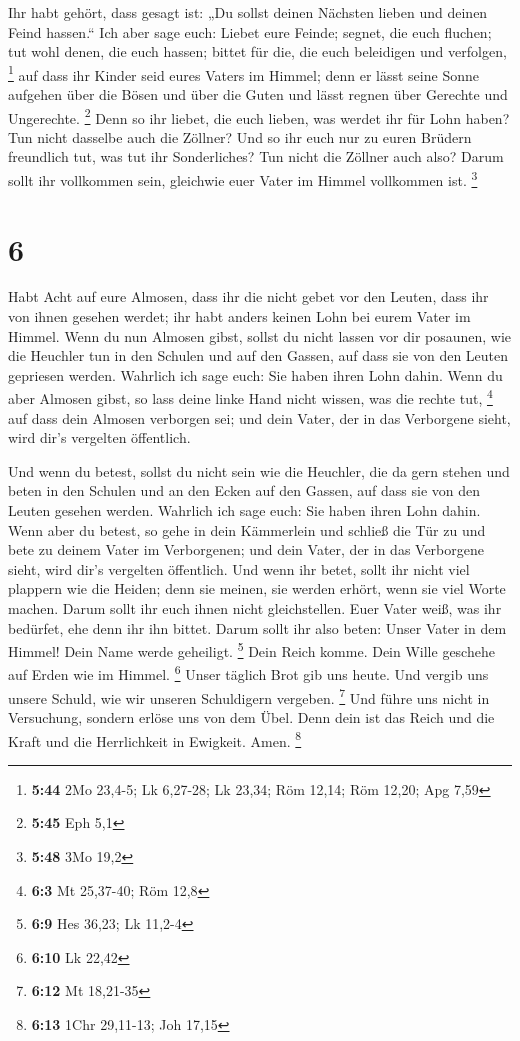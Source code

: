  Ihr habt gehört, dass gesagt ist: „Du sollst deinen
Nächsten lieben und deinen Feind hassen.``  Ich aber sage
euch: Liebet eure Feinde; segnet, die euch fluchen; tut wohl denen, die
euch hassen; bittet für die, die euch beleidigen und verfolgen,
\footnote{\textbf{5:44} 2Mo 23,4-5; Lk 6,27-28; Lk 23,34; Röm 12,14; Röm
  12,20; Apg 7,59}  auf dass ihr Kinder seid eures Vaters
im Himmel; denn er lässt seine Sonne aufgehen über die Bösen und über
die Guten und lässt regnen über Gerechte und Ungerechte. \footnote{\textbf{5:45}
  Eph 5,1}  Denn so ihr liebet, die euch lieben, was
werdet ihr für Lohn haben? Tun nicht dasselbe auch die Zöllner?
 Und so ihr euch nur zu euren Brüdern freundlich tut, was
tut ihr Sonderliches? Tun nicht die Zöllner auch also? 
Darum sollt ihr vollkommen sein, gleichwie euer Vater im Himmel
vollkommen ist. \footnote{\textbf{5:48} 3Mo 19,2}

\hypertarget{section-4}{%
\section{6}\label{section-4}}

 Habt Acht auf eure Almosen, dass ihr die nicht gebet vor
den Leuten, dass ihr von ihnen gesehen werdet; ihr habt anders keinen
Lohn bei eurem Vater im Himmel.  Wenn du nun Almosen
gibst, sollst du nicht lassen vor dir posaunen, wie die Heuchler tun in
den Schulen und auf den Gassen, auf dass sie von den Leuten gepriesen
werden. Wahrlich ich sage euch: Sie haben ihren Lohn dahin.
 Wenn du aber Almosen gibst, so lass deine linke Hand
nicht wissen, was die rechte tut, \footnote{\textbf{6:3} Mt 25,37-40;
  Röm 12,8}  auf dass dein Almosen verborgen sei; und dein
Vater, der in das Verborgene sieht, wird dir's vergelten öffentlich.

 Und wenn du betest, sollst du nicht sein wie die
Heuchler, die da gern stehen und beten in den Schulen und an den Ecken
auf den Gassen, auf dass sie von den Leuten gesehen werden. Wahrlich ich
sage euch: Sie haben ihren Lohn dahin.  Wenn aber du
betest, so gehe in dein Kämmerlein und schließ die Tür zu und bete zu
deinem Vater im Verborgenen; und dein Vater, der in das Verborgene
sieht, wird dir's vergelten öffentlich.  Und wenn ihr
betet, sollt ihr nicht viel plappern wie die Heiden; denn sie meinen,
sie werden erhört, wenn sie viel Worte machen.  Darum
sollt ihr euch ihnen nicht gleichstellen. Euer Vater weiß, was ihr
bedürfet, ehe denn ihr ihn bittet.  Darum sollt ihr also
beten: Unser Vater in dem Himmel! Dein Name werde geheiligt. \footnote{\textbf{6:9}
  Hes 36,23; Lk 11,2-4}  Dein Reich komme. Dein Wille
geschehe auf Erden wie im Himmel. \footnote{\textbf{6:10} Lk 22,42}
 Unser täglich Brot gib uns heute.  Und
vergib uns unsere Schuld, wie wir unseren Schuldigern vergeben.
\footnote{\textbf{6:12} Mt 18,21-35}  Und führe uns nicht
in Versuchung, sondern erlöse uns von dem Übel. Denn dein ist das Reich
und die Kraft und die Herrlichkeit in Ewigkeit. Amen. \footnote{\textbf{6:13}
  1Chr 29,11-13; Joh 17,15}


